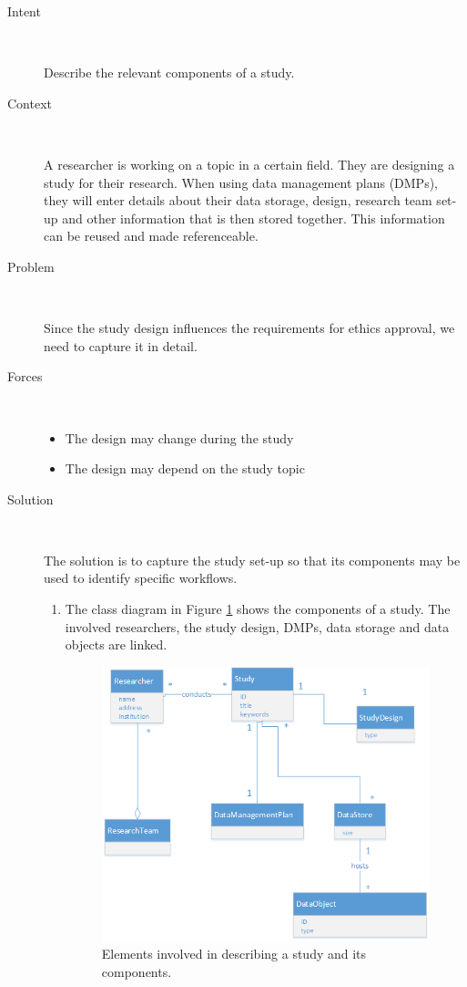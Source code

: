 \documentclass[10pt]{article}
\begin{document}
\begin{description}
	\item[Intent]~\par
		Describe the relevant components of a study.
		
	\item[Context]~\par
		 A researcher is working on a topic in a certain field. They are designing a study for their research. When using data management plans (DMPs), they will enter details about their data storage, design, research team set-up and other information that is then stored together. This information can be reused and made referenceable.


	\item[Problem]~\par
		Since the study design influences the requirements for ethics approval, we need to capture it in detail. 

	\item[Forces]~\par
	\begin{itemize}
		\item The design may change during the study
		\item The design may depend on the study topic
	\end{itemize}

	\item[Solution]~\par
		The solution is to capture the study set-up so that its components may be used to identify specific workflows.

	\begin{enumerate}
		\item The class diagram in Figure \ref{pat3cd1} shows the components of a study. The involved researchers, the study design, DMPs, data storage and data objects are linked. 
		
\begin{figure}[t]
\centering
	\includegraphics[width=1\textwidth]{img/decribestudy.png}
	\caption{Elements involved in describing a study and its components.}
	\label{pat3cd1}
\end{figure}	


\end{enumerate}
\end{description}
\end{document}
